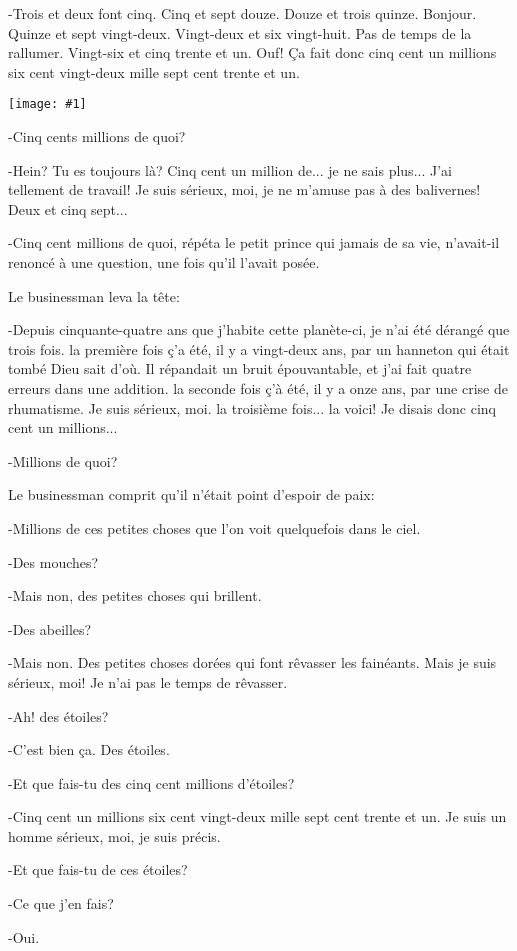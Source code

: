 \documentclass{report}
\newcommand{\incpic}[1]{%
\begin{center}
    \texttt{[image: \#1]}
\end{center}%
}
\begin{document}
-Trois et deux font cinq. Cinq et sept douze. Douze et trois quinze. Bonjour. Quinze et sept vingt-deux. Vingt-deux et six vingt-huit. Pas de temps de la rallumer. Vingt-six et cinq trente et un. Ouf! Ça fait donc cinq cent un millions six cent vingt-deux mille sept cent trente et un.

\incpic{pic/image28.jpeg}

-Cinq cents millions de quoi?

-Hein? Tu es toujours là? Cinq cent un million de... je ne sais plus... J'ai tellement de travail! Je suis sérieux, moi, je ne m'amuse pas à des balivernes! Deux et cinq sept...

-Cinq cent millions de quoi, répéta le petit prince qui jamais de sa vie, n'avait-il renoncé à une question, une fois qu'il l'avait posée.

Le businessman leva la tête:

-Depuis cinquante-quatre ans que j'habite cette planète-ci, je n'ai été dérangé que trois fois. la première fois ç'a été, il y a vingt-deux ans, par un hanneton qui était tombé Dieu sait d'où. Il répandait un bruit épouvantable, et j'ai fait quatre erreurs dans une addition. la seconde fois ç'à été, il y a onze ans, par une crise de rhumatisme. Je suis sérieux, moi. la troisième fois... la voici! Je disais donc cinq cent un millions...

-Millions de quoi?

Le businessman comprit qu'il n'était point d'espoir de paix:

-Millions de ces petites choses que l'on voit quelquefois dans le ciel.

-Des mouches?

-Mais non, des petites choses qui brillent.

-Des abeilles?

-Mais non. Des petites choses dorées qui font rêvasser les fainéants. Mais je suis sérieux, moi! Je n'ai pas le temps de rêvasser.

-Ah! des étoiles?

-C'est bien ça. Des étoiles.

-Et que fais-tu des cinq cent millions d'étoiles?

-Cinq cent un millions six cent vingt-deux mille sept cent trente et un. Je suis un homme sérieux, moi, je suis précis.

-Et que fais-tu de ces étoiles?

-Ce que j'en fais?

-Oui.
\end{document}
